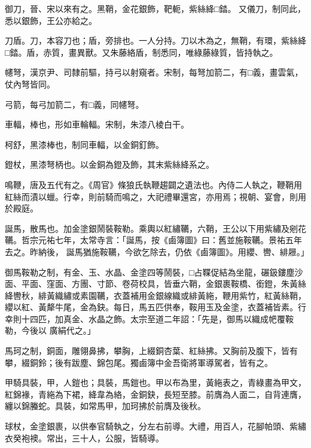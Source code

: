\begin{pinyinscope}
 御刀，晉、宋以來有之。黑鞘，金花銀飾，靶軛，紫絲絳□錔。
 又儀刀，制同此，悉以銀飾，王公亦給之。



 刀盾。刀，本容刀也；盾，旁排也。一人分持。刀以木為之，無鞘，有環，紫絲絳□錔。盾，赤質，畫異獸。又朱藤絡盾，制悉同，唯綠藤綠質，皆持執之。



 幰弩，漢京尹、司隸前驅，持弓以射窺者。宋制，每弩加箭二，有□義，畫雲氣，仗內弩皆同。



 弓箭，每弓加箭二，有□義，同幰弩。



 車輻，棒也，形如車輪輻。宋制，朱漆八棱白干。



 柯舒，黑漆棒也，制同車輻，以金銅釘飾。



 鐙杖，黑漆弩柄也。以金銅為鐙及飾，其末紫絲絳系之。



 鳴鞭，唐及五代有之。《周官》條狼氏執鞭趨闢之遺法也。內侍二人執之，鞭鞘用紅絲而漬以蠟。行幸，則前騎而鳴之，大祀禮畢還宮，亦用焉；視朝、宴會，則用於殿庭。



 誕馬，散馬也。加金塗銀鬧裝鞍勒。乘輿以紅繡韉，六鞘，王公以下用紫繡及剜花韉。哲宗元祐七年，太常寺言：「誕馬，按《鹵簿圖》曰：舊並施鞍韉。景祐五年去之。昨納後，
 誕馬猶施鞍韉，今欲乞除去，仍依《鹵簿圖》。用纓、轡、緋屜。」



 御馬鞍勒之制，有金、玉、水晶、金塗四等鬧裝，□占鞢促結為坐龍，碾鈒鏤塵沙面、平面、窪面、方團、寸節、卷荷校具，皆垂六鞘，金銀裹鞍橋、銜鐙，朱黃絲絳轡秋，緋黃織繡或素園韉，衣蓋補用金銀線織或緋黃絁，鞭用紫竹，紅黃絲鞘，纓以紅、黃犛牛尾，金為鈌。每日，馬五匹供奉，鞍用玉及金塗，衣蓋補皆素。行幸則十四匹，加真金、水晶之飾。太宗至道二年詔：「先是，御馬以織成帊覆鞍勒，今後以
 廣絹代之。」



 馬珂之制，銅面，雕翎鼻拂，攀胸，上綴銅杏葉、紅絲拂。又胸前及腹下，皆有攀，綴銅鈴；後有跋塵、錦包尾。獨鹵簿中金吾衛將軍導駕者，皆有之。



 甲騎具裝，甲，人鎧也；具裝，馬鎧也。甲以布為里，黃絁表之，青綠畫為甲文，紅錦褖，青絁為下裙，絳韋為絡，金銅鈌，長短至膝。前膺為人面二，自背連膺，纏以錦螣蛇。具裝，如常馬甲，加珂拂於前膺及後秋。



 球杖，金塗銀裹，以供奉官騎執之，分左右前導。大禮，用百人，花腳帕頭、紫繡衣癸袍襖。常出，三十人，公服，皆騎導。




\end{pinyinscope}
